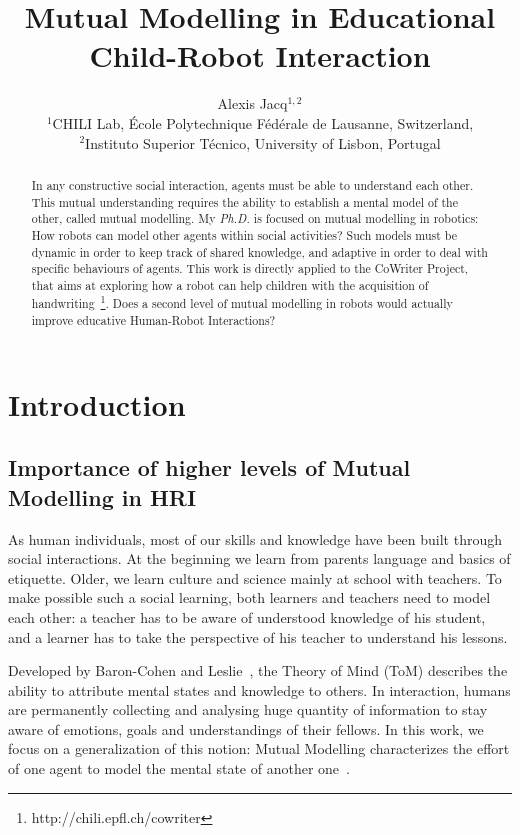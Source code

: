 \documentclass[10pt,a4paper]{article}
\begin{document}
\title{Mutual Modelling in Educational Child-Robot Interaction}


\author{Alexis Jacq$^{1,2}$\\
$^1$CHILI Lab, \'Ecole Polytechnique F\'ed\'erale de Lausanne, Switzerland,\\
$^2$Instituto Superior T\'{e}cnico, University of Lisbon, Portugal}



\maketitle
\begin{abstract}
In any constructive social interaction, agents must be able to understand each other. This mutual understanding requires the ability to establish a mental model of the other, called mutual modelling. My \textit{Ph.D.} is focused on mutual modelling in robotics: How robots can model other agents within social activities? Such models must be dynamic in order to keep track of shared knowledge, and adaptive in order to deal with specific behaviours of agents. 
This work is directly applied to the CoWriter Project, that aims at exploring how a robot can help children with the acquisition of handwriting~\footnote{http://chili.epfl.ch/cowriter}. Does a second level of mutual modelling in robots would actually improve educative Human-Robot Interactions?
\end{abstract}


\section{Introduction}
\subsection{Importance of higher levels of Mutual Modelling in HRI}

As human individuals, most of our skills and knowledge have been built through social interactions. At the beginning we learn from parents language and basics of etiquette.  Older, we learn culture and science mainly at school with teachers. To make possible such a social learning, both learners and teachers need to model each other: a teacher has to be aware of understood knowledge of his student, and a learner has to take the perspective of his teacher to understand his lessons. 

Developed by Baron-Cohen and Leslie~\cite{baron1985does}, the Theory of Mind (ToM) describes the ability to attribute mental states and knowledge to others. In interaction, humans are permanently collecting and analysing huge quantity of information to stay aware of emotions, goals and understandings of their fellows. In this work, we focus on a generalization of this notion: Mutual Modelling characterizes the effort of one agent to model the mental state of another one~\cite{dillenbourg1999you}. 
\end{document}
